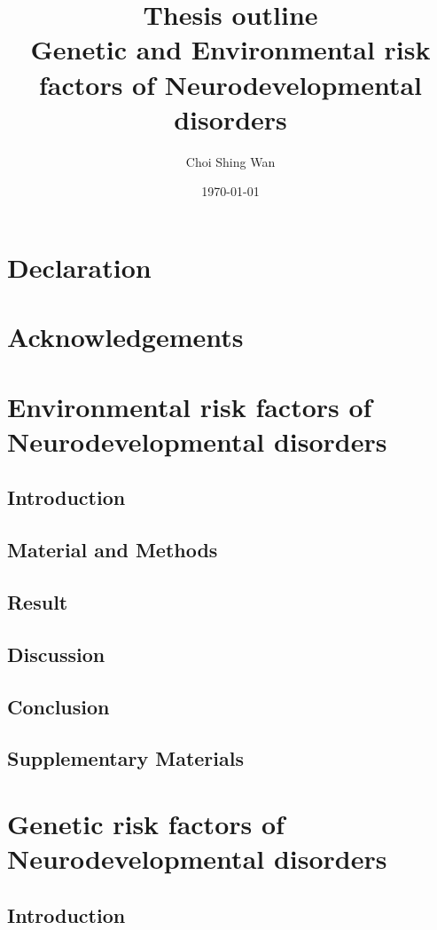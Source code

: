 \documentclass{report}
\title{Thesis outline \\
\large Genetic and Environmental risk factors of Neurodevelopmental disorders}
\date{\today}
\author{Choi Shing Wan}
\begin{document}
\maketitle
\chapter*{Declaration}
\chapter*{Acknowledgements}
\tableofcontents




\chapter{Environmental risk factors of Neurodevelopmental disorders}
\section{Introduction}

\section{Material and Methods}

\section{Result}

\section{Discussion}
\section{Conclusion}
\section{Supplementary Materials}


\chapter{Genetic risk factors of Neurodevelopmental disorders}
\section{Introduction}
\end{document}
